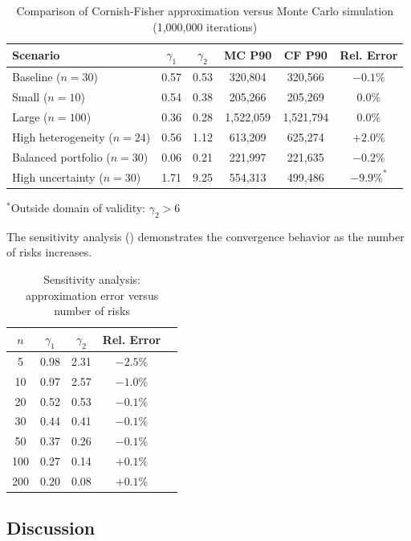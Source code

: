 \documentclass[12pt,a4paper]{article}
\theoremstyle{definition}
\theoremstyle{remark}
\begin{document}
\begin{table}[htbp]
\centering
\caption{Comparison of Cornish-Fisher approximation versus Monte Carlo simulation (1,000,000 iterations)}
\label{tab:validation}
\begin{tabular}{lccccc}
\toprule
Scenario & $\gamma_1$ & $\gamma_2$ & MC P90 & CF P90 & Rel. Error \\
\midrule
Baseline ($n=30$) & 0.57 & 0.53 & 320,804 & 320,566 & $-0.1\%$ \\
Small ($n=10$) & 0.54 & 0.38 & 205,266 & 205,269 & $0.0\%$ \\
Large ($n=100$) & 0.36 & 0.28 & 1,522,059 & 1,521,794 & $0.0\%$ \\
High heterogeneity ($n=24$) & 0.56 & 1.12 & 613,209 & 625,274 & $+2.0\%$ \\
Balanced portfolio ($n=30$) & 0.06 & 0.21 & 221,997 & 221,635 & $-0.2\%$ \\
High uncertainty ($n=30$) & 1.71 & 9.25 & 554,313 & 499,486 & $-9.9\%^*$ \\
\bottomrule
\end{tabular}
\smallskip
\footnotesize{$^*$Outside domain of validity: $\gamma_2 > 6$}
\end{table}

The sensitivity analysis () demonstrates the convergence behavior as the number of risks increases.

\begin{table}[htbp]
\centering
\caption{Sensitivity analysis: approximation error versus number of risks}
\label{tab:sensitivity}
\begin{tabular}{ccccc}
\toprule
$n$ & $\gamma_1$ & $\gamma_2$ & Rel. Error \\
\midrule
5 & 0.98 & 2.31 & $-2.5\%$ \\
10 & 0.97 & 2.57 & $-1.0\%$ \\
20 & 0.52 & 0.53 & $-0.1\%$ \\
30 & 0.44 & 0.41 & $-0.1\%$ \\
50 & 0.37 & 0.26 & $-0.1\%$ \\
100 & 0.27 & 0.14 & $+0.1\%$ \\
200 & 0.20 & 0.08 & $+0.1\%$ \\
\bottomrule
\end{tabular}
\end{table}

\subsection{Discussion}
\end{document}
